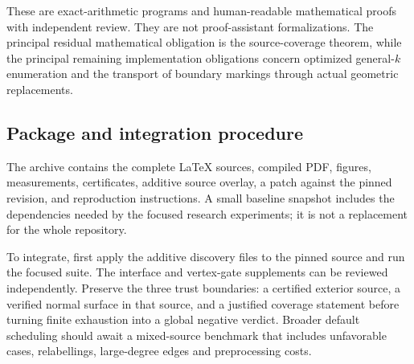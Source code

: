 

These are exact-arithmetic programs and human-readable mathematical
proofs with independent review. They are not proof-assistant
formalizations. The principal residual mathematical obligation is the
source-coverage theorem, while the principal remaining implementation
obligations concern optimized general-$k$ enumeration and the transport
of boundary markings through actual geometric replacements.

\subsection{Package and integration procedure}

The archive contains the complete \LaTeX{} sources, compiled PDF,
figures, measurements, certificates, additive source overlay, a patch
against the pinned revision, and reproduction instructions. A small
baseline snapshot includes the dependencies needed by the focused
research experiments; it is not a replacement for the whole repository.

To integrate, first apply the additive discovery files to the pinned
source and run the focused suite. The interface and vertex-gate
supplements can be reviewed independently. Preserve the three trust
boundaries: a certified exterior source, a verified normal surface in
that source, and a justified coverage statement before turning finite
exhaustion into a global negative verdict. Broader default scheduling
should await a mixed-source benchmark that includes unfavorable cases,
relabellings, large-degree edges and preprocessing costs.
